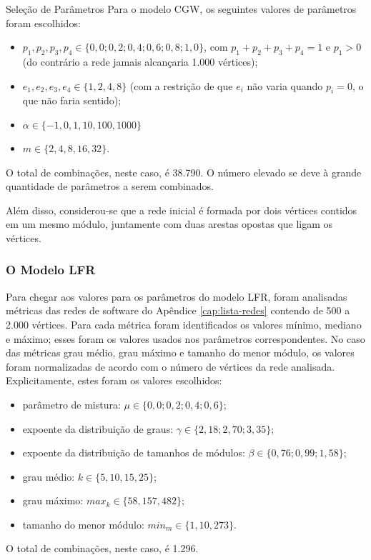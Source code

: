 \begin{section}{Seleção de Parâmetros}
Para o modelo CGW, os seguintes valores de parâmetros foram escolhidos:

\begin{itemize}
	\item $p_1, p_2, p_3, p_4 \in \{0,0; 0,2; 0,4; 0,6; 0,8; 1,0\}$, com $p_1 + p_2 + p_3 + p_4 = 1$ e $p_1 > 0$ (do contrário a rede jamais alcançaria 1.000 vértices);
	\item $e_1, e_2, e_3, e_4 \in \{1, 2, 4, 8\}$ (com a restrição de que $e_i$ não varia quando $p_i = 0$, o que não faria sentido);
	\item $\alpha \in \{-1, 0, 1, 10, 100, 1000\}$
	\item $m \in \{2, 4, 8, 16, 32\}$.
\end{itemize}

O total de combinações, neste caso, é 38.790. O número elevado se deve à grande quantidade de parâmetros a serem combinados.

Além disso, considerou-se que a rede inicial é formada por dois vértices contidos em um mesmo módulo, juntamente com duas arestas opostas que ligam os vértices.

\subsubsection{O Modelo LFR}

Para chegar aos valores para os parâmetros do modelo LFR, foram analisadas métricas das redes de software do Apêndice \ref{cap:lista-redes} contendo de 500 a 2.000 vértices. Para cada métrica foram identificados os valores mínimo, mediano e máximo; esses foram os valores usados nos parâmetros correspondentes. No caso das métricas grau médio, grau máximo e tamanho do menor módulo, os valores foram normalizadas de acordo com o número de vértices da rede analisada. Explicitamente, estes foram os valores escolhidos:

\begin{itemize}
	\item parâmetro de mistura: $\mu \in \{0,0; 0,2; 0,4; 0,6\}$;
	\item expoente da distribuição de graus: $\gamma \in \{2,18; 2,70; 3,35\}$;
	\item expoente da distribuição de tamanhos de módulos: $\beta \in \{0,76; 0,99; 1,58\}$;
	\item grau médio: $k \in \{5, 10, 15, 25\}$;
	\item grau máximo: $max_k \in \{58, 157, 482\}$;
	\item tamanho do menor módulo: $min_m \in \{1, 10, 273\}$.
\end{itemize}

O total de combinações, neste caso, é 1.296.


\end{section}


